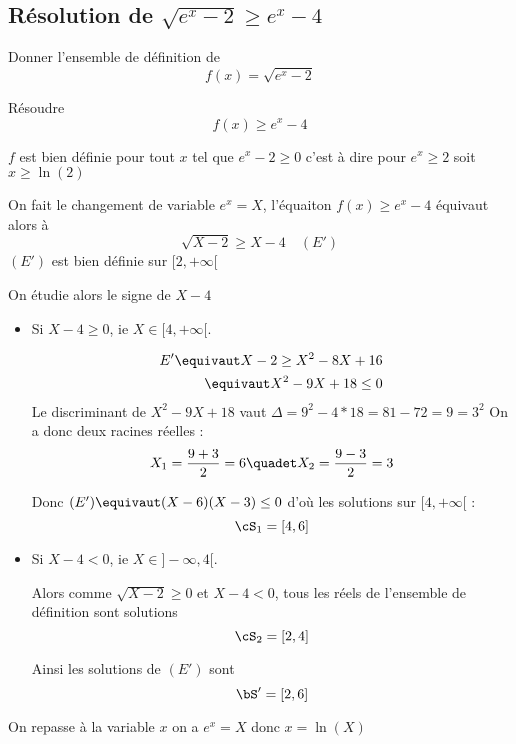 \subsection{Résolution de $\sqrt{e^x-2} \geq e^{x}-4$}
\begin{exercice}
Donner l'ensemble de définition de 
$$f(x) = \sqrt{e^x-2}$$

Résoudre $$f(x)\geq e^{x}-4$$
\end{exercice}

\begin{correction}
$f$ est bien définie pour tout $x$ tel que $e^x-2\geq 0$ c'est à dire pour $e^x\geq2$ soit $x\geq \ln(2)$

\conclusion{ $D_f =[\ln(2),+\infty[$}

On fait le changement de variable $e^x=X$, l'équaiton $f(x) \geq e^x-4$ équivaut alors à 
$$\sqrt{X-2} \geq X-4 \quad (E')$$
$(E')$ est bien définie sur $[2,+\infty[$

On étudie alors le signe de $X-4$

\begin{itemize}
\item Si $X-4\geq 0$, ie $X\in [4,+\infty[$. 

\begin{align*}
E' \equivaut X-2 \geq X^2 - 8X +16\\
	\equivaut X^2 -9X +18\leq 0
\end{align*}
Le discriminant de $X^2 -9X +18$ vaut $\Delta =9^2 - 4*18 = 81- 72 =9=3^2$
On a donc deux racines réelles : 
$$X_1= \frac{9 +3}{2} = 6 \quadet X_2 = \frac{9-3}{2}= 3$$

Donc $(E') \equivaut  (X-6)(X-3)\leq 0$ d'où les solutions sur $ [4,+\infty[$ : 
$$\cS_1= [4,6]$$


\item Si $X-4<0$, ie $X\in ]-\infty,4[$. 

Alors comme $\sqrt{X-2} \geq 0$  et $X-4<0$, tous les réels de l'ensemble de définition sont solutions 
$$\cS_2 = [2,4]$$


Ainsi les solutions de $(E')$ sont 
$$\bS' = [2,6]$$



\end{itemize}

On repasse à la variable $x$ on a $e^x =X$ donc $x =\ln(X)$


\end{correction}